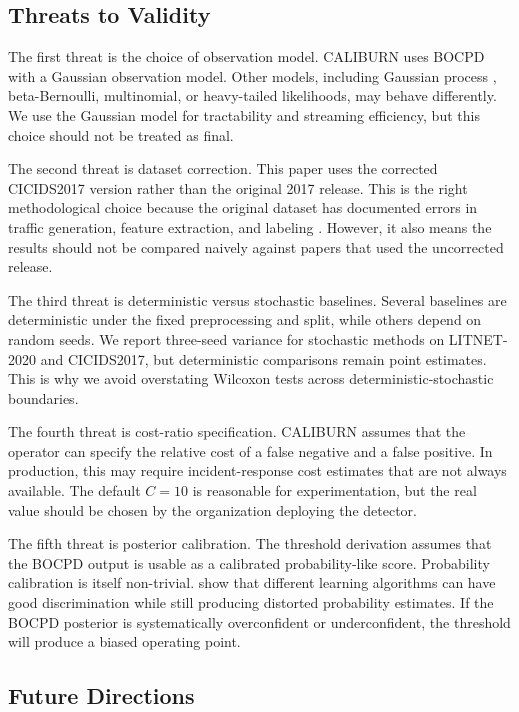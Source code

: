 \documentclass[preprint,12pt,authoryear]{elsarticle}
\newcommand{\caliburn}{CALIBURN}
\begin{document}
\subsection{Threats to Validity}
\label{sec:disc-threats}

The first threat is the choice of observation model. \caliburn{} uses BOCPD with a Gaussian observation model. Other models, including Gaussian process \citep{saatci2010gaussian}, beta-Bernoulli, multinomial, or heavy-tailed likelihoods, may behave differently. We use the Gaussian model for tractability and streaming efficiency, but this choice should not be treated as final.

The second threat is dataset correction. This paper uses the corrected CICIDS2017 version rather than the original 2017 release. This is the right methodological choice because the original dataset has documented errors in traffic generation, feature extraction, and labeling \citep{engelen2021troubleshooting,liu2022errorprevalence}. However, it also means the results should not be compared naively against papers that used the uncorrected release.

The third threat is deterministic versus stochastic baselines. Several baselines are deterministic under the fixed preprocessing and split, while others depend on random seeds. We report three-seed variance for stochastic methods on LITNET-2020 and CICIDS2017, but deterministic comparisons remain point estimates. This is why we avoid overstating Wilcoxon tests across deterministic-stochastic boundaries.

The fourth threat is cost-ratio specification. \caliburn{} assumes that the operator can specify the relative cost of a false negative and a false positive. In production, this may require incident-response cost estimates that are not always available. The default $C = 10$ is reasonable for experimentation, but the real value should be chosen by the organization deploying the detector.

The fifth threat is posterior calibration. The threshold derivation assumes that the BOCPD output is usable as a calibrated probability-like score. Probability calibration is itself non-trivial. \citet{niculescu2005predicting} show that different learning algorithms can have good discrimination while still producing distorted probability estimates. If the BOCPD posterior is systematically overconfident or underconfident, the threshold will produce a biased operating point.

\subsection{Future Directions}
\label{sec:disc-future}
\end{document}
